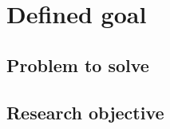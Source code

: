 \section{Defined goal}\label{sec:defined-goal}

\subsection{Problem to solve}\label{subsec:problem-to-solve}


\subsection{Research objective}\label{subsec:research-objective}


